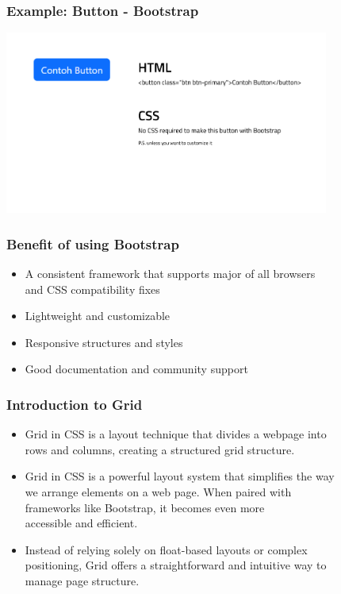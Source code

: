 \documentclass[aspectratio=169, table]{beamer}
\begin{document}
\begin{frame}[fragile]
	\frametitle{Example: Button - Bootstrap}
	\vskip1cm
	\begin{center}
		\includegraphics[width=0.8\textwidth]{classFiles/button-bootstrap.png}
	\end{center}
\end{frame}



\begin{frame2}
   \frametitle{Benefit of using Bootstrap}
   \vskip1cm
    \begin{itemize}
        \item A consistent framework that supports major of all browsers \\and CSS compatibility fixes
        \item Lightweight and customizable
        \item Responsive structures and styles
	\item Good documentation and community support
    \end{itemize}
\end{frame2}

\begin{frame2}
    \frametitle{Introduction to Grid}
    \vskip2cm
    \begin{itemize}
        \item Grid in CSS is a layout technique that divides a webpage into\\ rows and columns, creating a structured grid structure. 
        \item Grid in CSS is a powerful layout system that simplifies the way \\we arrange elements on a web page. When paired with \\frameworks like Bootstrap, it becomes even more \\accessible and efficient. 
        \item Instead of relying solely on float-based layouts or complex\\ positioning, Grid offers a straightforward and intuitive way to \\manage page structure.
    \end{itemize}
\end{frame2}
\end{document}
